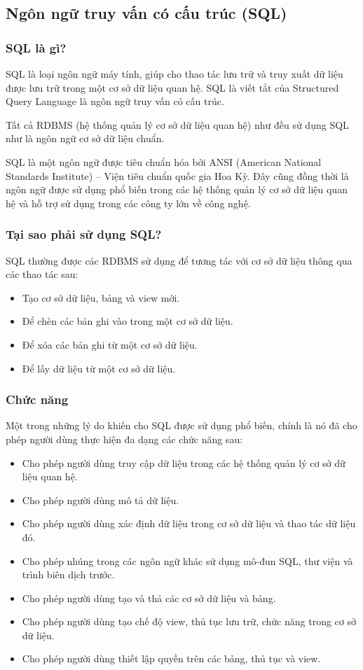 \subsection{Ngôn ngữ truy vấn có cấu trúc (SQL)}
\subsubsection{SQL là gì?}
SQL là loại ngôn ngữ máy tính, giúp cho thao tác lưu trữ và truy xuất dữ liệu được lưu trữ trong một cơ sở dữ liệu quan hệ. SQL là viết tắt của Structured Query Language là ngôn ngữ truy vấn có cấu trúc.

Tất cả RDBMS (hệ thống quản lý cơ sở dữ liệu quan hệ) như đều sử dụng SQL như là ngôn ngữ cơ sở dữ liệu chuẩn.

SQL là một ngôn ngữ được tiêu chuẩn hóa bởi ANSI (American National Standards Institute) – Viện tiêu chuẩn quốc gia Hoa Kỳ. Đây cũng đồng thời là ngôn ngữ được sử dụng phổ biến trong các hệ thống quản lý cơ sở dữ liệu quan hệ và hỗ trợ sử dụng trong các công ty lớn về công nghệ.
\subsubsection{Tại sao phải sử dụng SQL?}
SQL thường được các RDBMS sử dụng để tương tác với cơ sở dữ liệu thông qua các thao tác sau:
\begin{itemize}
    \item Tạo cơ sở dữ liệu, bảng và view mới.
    \item Để chèn các bản ghi vào trong một cơ sở dữ liệu.
    \item Để xóa các bản ghi từ một cơ sở dữ liệu.
    \item Để lấy dữ liệu từ một cơ sở dữ liệu.
\end{itemize}
\subsubsection{Chức năng}
Một trong những lý do khiến cho SQL được sử dụng phổ biến, chính là nó đã cho phép người dùng thực hiện đa dạng các chức năng sau:
\begin{itemize}
    \item Cho phép người dùng truy cập dữ liệu trong các hệ thống quản lý cơ sở dữ liệu quan hệ.
    \item Cho phép người dùng mô tả dữ liệu.
    \item Cho phép người dùng xác định dữ liệu trong cơ sở dữ liệu và thao tác dữ liệu đó.
    \item Cho phép nhúng trong các ngôn ngữ khác sử dụng mô-đun SQL, thư viện và trình biên dịch trước.
    \item Cho phép người dùng tạo và thả các cơ sở dữ liệu và bảng.
    \item Cho phép người dùng tạo chế độ view, thủ tục lưu trữ, chức năng trong cơ sở dữ liệu.
    \item Cho phép người dùng thiết lập quyền trên các bảng, thủ tục và view.
\end{itemize}
